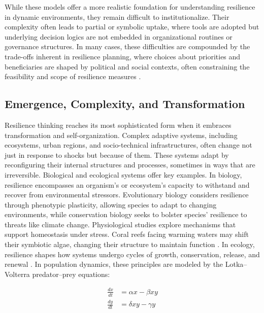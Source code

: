 While these models offer a more realistic foundation for understanding resilience in dynamic environments, they remain difficult to institutionalize. Their complexity often leads to partial or symbolic uptake, where tools are adopted but underlying decision logics are not embedded in organizational routines or governance structures. In many cases, these difficulties are compounded by the trade-offs inherent in resilience planning, where choices about priorities and beneficiaries are shaped by political and social contexts, often constraining the feasibility and scope of resilience measures \autocite{leichenko2024climate}.

\subsection{Emergence, Complexity, and Transformation}
\label{appendix:A4}

Resilience thinking reaches its most sophisticated form when it embraces transformation and self-organization. Complex adaptive systems, including ecosystems, urban regions, and socio-technical infrastructures, often change not just in response to shocks but because of them. These systems adapt by reconfiguring their internal structures and processes, sometimes in ways that are irreversible. Biological and ecological systems offer key examples. In biology, resilience encompasses an organism’s or ecosystem’s capacity to withstand and recover from environmental stressors. Evolutionary biology considers resilience through phenotypic plasticity, allowing species to adapt to changing environments, while conservation biology seeks to bolster species’ resilience to threats like climate change. Physiological studies explore mechanisms that support homeostasis under stress. Coral reefs facing warming waters may shift their symbiotic algae, changing their structure to maintain function \autocite{feder2019biology}. In ecology, resilience shapes how systems undergo cycles of growth, conservation, release, and renewal \autocite{gunderson2002panarchy}. In population dynamics, these principles are modeled by the Lotka–Volterra predator–prey equations:

\vspace{0.3cm}
\begin{align}
    \frac{dx}{dt} &= \alpha x - \beta xy\\
    \frac{dy}{dt} &= \delta xy - \gamma y   
\end{align}
\vspace{0.3cm}


